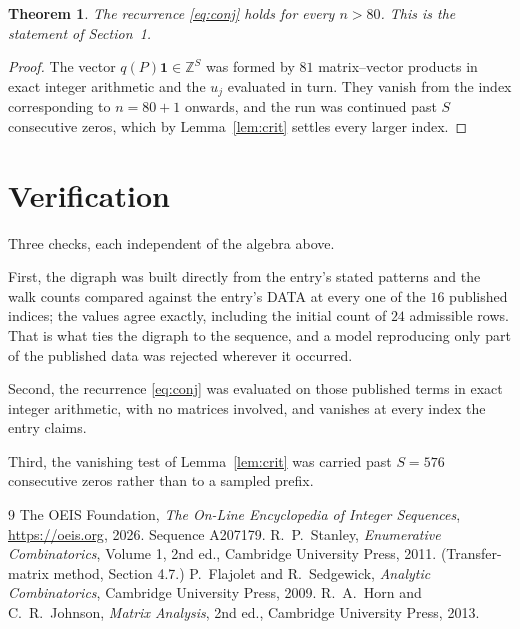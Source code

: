 \documentclass[11pt,a4paper]{article}
\theoremstyle{plain}
\newtheorem{theorem}{Theorem}
\theoremstyle{definition}
\begin{document}
\begin{theorem}
The recurrence \eqref{eq:conj} holds for every $n>80$. This is the statement of
Section~1.
\end{theorem}

\begin{proof}
The vector $q(P)\mathbf{1}\in\mathbb{Z}^{S}$ was formed by $81$ matrix--vector
products in exact integer arithmetic and the $u_j$ evaluated in turn. They vanish from the
index corresponding to $n=80+1$ onwards, and the run was continued past $S$ consecutive
zeros, which by Lemma~\ref{lem:crit} settles every larger index.
\end{proof}

\section{Verification}

Three checks, each independent of the algebra above.

First, the digraph was built directly from the entry's stated patterns and the walk counts
compared against the entry's DATA at every one of the $16$ published indices; the
values agree exactly, including the initial count of $24$ admissible rows. That is
what ties the digraph to the sequence, and a model reproducing only part of the published
data was rejected wherever it occurred.

Second, the recurrence \eqref{eq:conj} was evaluated on those published terms in exact
integer arithmetic, with no matrices involved, and vanishes at every index the entry claims.

Third, the vanishing test of Lemma~\ref{lem:crit} was carried past $S=576$ consecutive
zeros rather than to a sampled prefix.

\begin{thebibliography}{9}
 The OEIS Foundation, \emph{The On-Line Encyclopedia of Integer
Sequences}, \url{https://oeis.org}, 2026. Sequence A207179.
 R.~P.~Stanley, \emph{Enumerative Combinatorics}, Volume 1, 2nd ed.,
Cambridge University Press, 2011. (Transfer-matrix method, Section 4.7.)
 P.~Flajolet and R.~Sedgewick, \emph{Analytic Combinatorics}, Cambridge
University Press, 2009.
 R.~A.~Horn and C.~R.~Johnson, \emph{Matrix Analysis}, 2nd ed., Cambridge
University Press, 2013.
\end{thebibliography}
\end{document}
